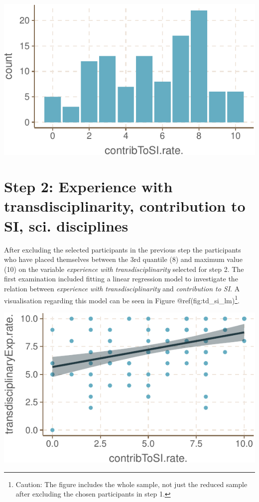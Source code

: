 \documentclass[]{tufte-book}
\begin{document}
\includegraphics{03_SIVOCS_int-cand_files/figure-latex/step1-1}

\hypertarget{step-2-experience-with-transdisciplinarity-contribution-to-si-sci.-disciplines}{%
\section{Step 2: Experience with transdisciplinarity, contribution to
SI, sci.
disciplines}\label{step-2-experience-with-transdisciplinarity-contribution-to-si-sci.-disciplines}}

After excluding the selected participants in the previous step the
participants who have placed themselves between the 3rd quantile (8) and
maximum value (10) on the variable \emph{experience with
transdisciplinarity} selected for step 2. The first examination included
fitting a linear regression model to investigate the relation between
\emph{experience with transdisciplinarity} and \emph{contribution to
SI}. A visualisation regarding this model can be seen in Figure
@ref(fig:td\_si\_lm)\footnote{Caution: The figure includes the whole
  sample, not just the reduced sample after excluding the chosen
  participants in step 1.}.

\includegraphics{03_SIVOCS_int-cand_files/figure-latex/td_si_lm-1}
\end{document}
